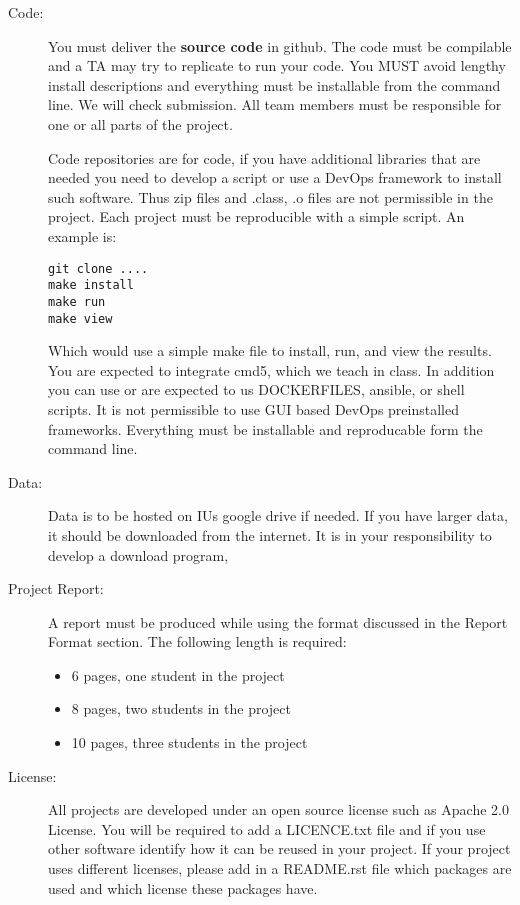 \begin{description}
\item[Code:]
You must deliver the \textbf{source code} in github. The code must be
compilable and a TA may try to replicate to run your code. You MUST
avoid lengthy install descriptions and everything must be installable
from the command line. We will check submission. All team members must
be responsible for one or all parts of the project.

Code repositories are for code, if you have additional libraries that
are needed you need to develop a script or use a DevOps framework to
install such software. Thus zip files and .class, .o files are not
permissible in the project. Each project must be reproducible with a
simple script. An example is:

\begin{verbatim}
git clone ....
make install
make run
make view
\end{verbatim}

Which would use a simple make file to install, run, and view the
results.  You are expected to integrate cmd5, which we teach in
class. In addition you can use or are expected to us DOCKERFILES,
ansible, or shell scripts. It is not permissible to use GUI based
DevOps preinstalled frameworks. Everything must be installable and
reproducable form the command line.

\item[Data:] Data is to be hosted on IUs google drive if needed. If
  you have larger data, it should be downloaded from the internet. It
  is in your responsibility to develop a download program,
\item[Project Report:] A report must be produced while using the
  format discussed in the Report Format section. The following length
  is required:

\begin{itemize}
\item
  6 pages, one student in the project
\item
  8 pages, two students in the project
\item
  10 pages, three students in the project
\end{itemize}

\item[License:] All projects are developed under an open source
  license such as Apache 2.0 License. You will be required to add a
  LICENCE.txt file and if you use other software identify how it can
  be reused in your project. If your project uses different licenses,
  please add in a README.rst file which packages are used and which
  license these packages have.
\end{description}

